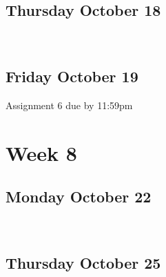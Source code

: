 \documentclass[]{book}
\let\originaltabular\tabular
\let\endoriginaltabular\endtabular
\renewenvironment{tabular}[1]{%
  \begingroup%
  \centering%
  \originaltabular{#1}}%
  {\endoriginaltabular\endgroup}
\theoremstyle{definition}
\theoremstyle{definition}
\theoremstyle{definition}
\theoremstyle{remark}
\begin{document}
\subsection{Thursday October 18}\label{thursday-october-18}

\begin{table}[H]
\centering
\begin{tabular}{l}
\hline
\\
\hline
\end{tabular}
\end{table}

\subsection{Friday October 19}\label{friday-october-19}

\begin{table}[H]
\centering
\begin{tabular}{l}
\hline
Assignment 6 due by 11:59pm\\
\hline
\end{tabular}
\end{table}

\section{Week 8}\label{week-8}

\subsection{Monday October 22}\label{monday-october-22}

\begin{table}[H]
\centering
\begin{tabular}{l}
\hline
\\
\hline
\end{tabular}
\end{table}

\subsection{Thursday October 25}\label{thursday-october-25}

\begin{table}[H]
\centering
\begin{tabular}{l}
\hline
\\
\hline
\end{tabular}
\end{table}
\end{document}
